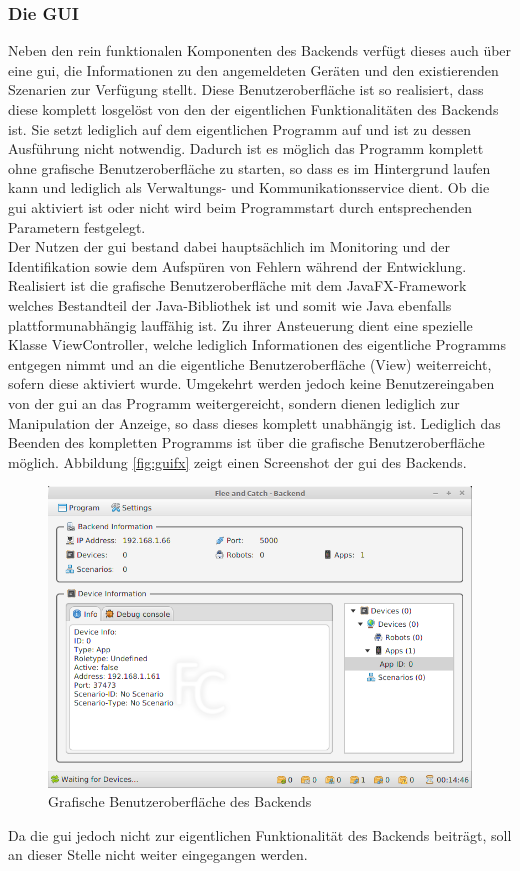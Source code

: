 \subsubsection{Die GUI}
Neben den rein funktionalen Komponenten des Backends verfügt dieses auch über eine \gls{gui}, die Informationen zu
den angemeldeten Geräten und den existierenden Szenarien zur Verfügung stellt. Diese Benutzeroberfläche ist so realisiert, dass diese 
komplett losgelöst von den der eigentlichen Funktionalitäten des Backends ist. Sie setzt lediglich auf dem eigentlichen Programm auf und
ist zu dessen Ausführung nicht notwendig. Dadurch ist es möglich das Programm komplett ohne grafische Benutzeroberfläche zu starten, so
dass es im Hintergrund laufen kann und lediglich als Verwaltungs- und Kommunikationsservice dient. Ob die \gls{gui}  
aktiviert ist oder nicht wird beim Programmstart durch entsprechenden Parametern festgelegt. \\
Der Nutzen der \gls{gui} bestand dabei hauptsächlich im Monitoring und der Identifikation sowie dem Aufspüren von Fehlern während der 
Entwicklung. \\
Realisiert ist die grafische Benutzeroberfläche mit dem JavaFX-Framework welches Bestandteil der Java-Bibliothek ist und somit wie 
Java ebenfalls plattformunabhängig lauffähig ist. Zu ihrer Ansteuerung dient eine spezielle Klasse ViewController, welche lediglich Informationen des eigentliche Programms entgegen nimmt und an die eigentliche Benutzeroberfläche 
(View) weiterreicht, sofern diese aktiviert wurde. Umgekehrt werden jedoch keine Benutzereingaben von der \gls{gui} an das Programm weitergereicht, sondern dienen lediglich zur Manipulation der Anzeige, so dass dieses komplett unabhängig ist. Lediglich das Beenden des kompletten Programms ist über die grafische Benutzeroberfläche möglich.
Abbildung \eqref{fig:guifx} zeigt einen Screenshot der \gls{gui} des Backends.
\begin{figure}[ht]
	\centering
	\includegraphics[width=1.0\textwidth]{images/implementation/BackendGUI.png}
	\caption[\gls{gui} des Backends]{Grafische Benutzeroberfläche des Backends}
	\label{fig:guifx}
\end{figure}
\newline
Da die \gls{gui} jedoch nicht zur eigentlichen Funktionalität des Backends beiträgt, soll an dieser Stelle nicht 
weiter eingegangen werden.
\newpage

